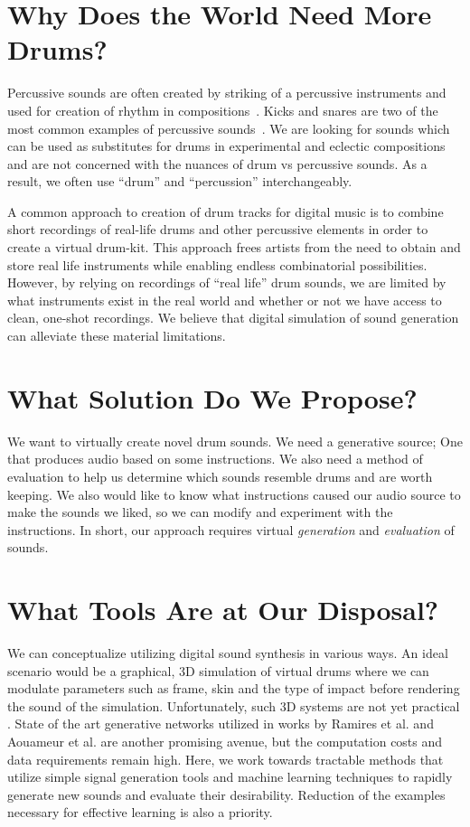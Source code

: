 \documentclass[\main/thesis.tex]{subfiles}
\begin{document}
\section{Why Does the World Need More Drums?}
Percussive sounds are often created by striking of a percussive instruments and used for creation of rhythm in compositions~\cite{needham1967percussion}. Kicks and snares are two of the most common examples of percussive sounds~\cite{barry2005drum}. We are looking for sounds which can be used as substitutes for drums in experimental and eclectic compositions and are not concerned with the nuances of drum vs percussive sounds. As a result, we often use \enquote{drum} and \enquote{percussion} interchangeably.

A common approach to creation of drum tracks for digital music is to combine short recordings of real-life drums and other percussive elements in order to create a virtual drum-kit. This approach frees artists from the need to obtain and store real life instruments while enabling endless combinatorial possibilities. However, by relying on recordings of \enquote{real life} drum sounds, we are limited by what instruments exist in the real world and whether or not we have access to clean, one-shot recordings. We believe that digital simulation of sound generation can alleviate these material limitations. 
 
\section{What Solution Do We Propose?}
We want to virtually create novel drum sounds. We need a generative source; One that produces audio based on some instructions. We also need a method of evaluation to help us determine which sounds resemble drums and are worth keeping. We also would like to know what instructions caused our audio source to make the sounds we liked, so we can modify and experiment with the instructions. In short, our approach requires virtual \textit{generation} and \textit{evaluation} of sounds. 

\section{What Tools Are at Our Disposal?}
\label{sec_tools_disposal}
We can conceptualize utilizing digital sound synthesis in various ways. An ideal scenario would be a graphical, 3D simulation of virtual drums where we can modulate parameters such as frame, skin and the type of impact before rendering the sound of the simulation. Unfortunately, such 3D systems are not yet practical \cite{langlois2016toward}. State of the art generative networks utilized in works by Ramires et al. \cite{ramires2020neural} and Aouameur et al.\cite{aouameur2019neural} 
are another promising avenue, but the computation costs and data requirements remain high. Here, we work towards tractable methods that utilize simple signal generation tools and machine learning techniques to rapidly generate new sounds and evaluate their desirability. Reduction of the examples necessary for effective learning is also a priority.
\end{document}
